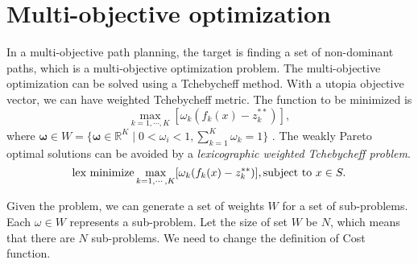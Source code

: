 \documentclass[paper=a4, fontsize=11pt]{scrartcl}
\begin{document}
\section{Multi-objective optimization}

In a multi-objective path planning, the target is finding a set of non-dominant paths, which is a multi-objective optimization problem.
The multi-objective optimization can be solved using a Tchebycheff method.
With a utopia objective vector, we can have weighted Tchebycheff metric.
The function to be minimized is  
\begin{equation}
\max_{k=1, \cdots , K} [ \omega_{k}  ( f_{k} (x) - z^{**}_{k} ) ],
\end{equation}
where $ \mathbf{\omega} \in W = \{ \mathbf{\omega} \in \mathbf{\mathbb{R}}^{K} \mid 0 < \omega_{i} < 1 , \sum^{K}_{k=1} \omega_{k} = 1 \} $ .
The weakly Pareto optimal solutions can be avoided by a \emph{lexicographic weighted Tchebycheff problem}.
\begin{equation}
\mbox{lex minimize} \max_{k=1, \cdots , K} [ \omega_{k}  ( f_{k} (x) - z^{**}_{k} ) ], \\
\mbox{subject to } x \in S.
\end{equation}

Given the problem, we can generate a set of weights $ W $ for a set of sub-problems.
Each $ \omega \in W $ represents a sub-problem.
Let the size of set $ W $ be $ N $, which means that there are $ N $ sub-problems.
We need to change the definition of Cost function.

\begin{comment}
How to maintain the update of reference paths
Especially, when the reference paths changed, how to update the Cost of each link?
\end{comment}
\end{document}
